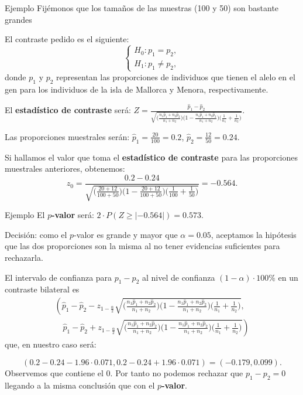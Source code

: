 \documentclass[
  ignorenonframetext,
]{beamer}
\begin{document}
\begin{frame}{Ejemplo}
\protect\hypertarget{ejemplo-13}{}
Fijémonos que los tamaños de las muestras (100 y 50) son bastante
grandes

El contraste pedido es el siguiente: \[
\left\{\begin{array}{l}
H_0:p_1=p_2,\\
H_1:p_1\neq p_2,
\end{array}\right.
\] donde \(p_1\) y \(p_2\) representan las proporciones de individuos
que tienen el alelo en el gen para los individuos de la isla de Mallorca
y Menora, respectivamente.

El \textbf{estadístico de contraste} será:
\(Z=\frac{\widehat{p}_1 -\widehat{p}_2}{ \sqrt{\Big(\frac{n_1 \widehat{p}_1 +n_2 \widehat{p}_2}{n_1 +n_2}\Big)\Big(1-\frac{n_1 \widehat{p}_1 +n_2 \widehat{p}_2}{n_1 +n_2}\Big)\Big(\frac1{n_1}+\frac1{n_2} \Big)}}.\)

Las proporciones muestrales serán:
\(\widehat{p}_1 =\frac{20}{100}=0.2\),
\(\widehat{p}_2 = \frac{12}{50}=0.24\).

Si hallamos el valor que toma el \textbf{estadístico de contraste} para
las proporciones muestrales anteriores, obtenemos:
\[z_0=\frac{0.2 -0.24}{
\sqrt{\Big(\frac{20+12}{100+50}\Big)\Big(1-\frac{20 +12}{100+50}\Big)\Big(\frac1{100}+\frac1{50}\Big)}}=-0.564.\]
\end{frame}

\begin{frame}{Ejemplo}
\protect\hypertarget{ejemplo-14}{}
El \textbf{\(p\)-valor} será: \(2\cdot P(Z\geq |-0.564|)=0.573.\)

Decisión: como el \(p\)-valor es grande y mayor que \(\alpha=0.05\),
aceptamos la hipótesis que las dos proporciones son la misma al no tener
evidencias suficientes para rechazarla.

El intervalo de confianza para \(p_1-p_2\) al nivel de confianza
\((1-\alpha)\cdot 100\%\) en un contraste bilateral es \[
\begin{array}{l}
\left(\widehat{p}_1-\widehat{p}_2-z_{1-\frac{\alpha}2}\sqrt{\Big(\frac{n_1 \widehat{p}_1 +n_2 \widehat{p}_2}{n_1
+n_2}\Big)\Big(1-\frac{n_1 \widehat{p}_1 +n_2 \widehat{p}_2}{n_1
+n_2}\Big)\Big(\frac1{n_1}+\frac1{n_2}
\Big)},\right.\\
\quad
\left.\widehat{p}_1-\widehat{p}_2+z_{1-\frac{\alpha}2}\sqrt{\Big(\frac{n_1 \widehat{p}_1 +n_2 \widehat{p}_2}{n_1
+n_2}\Big)\Big(1-\frac{n_1 \widehat{p}_1 +n_2 \widehat{p}_2}{n_1
+n_2}\Big)\Big(\frac1{n_1}+\frac1{n_2}
\Big)}
\right)
\end{array}
\] que, en nuestro caso será:

\[
(0.2 -0.24-1.96\cdot 0.071, 0.2-0.24 +1.96\cdot 0.071) =(-0.179,0.099).
\] Observemos que contiene el 0. Por tanto no podemos rechazar que
\(p_1-p_2=0\) llegando a la misma conclusión que con el
\textbf{\(p\)-valor}.
\end{frame}
\end{document}

